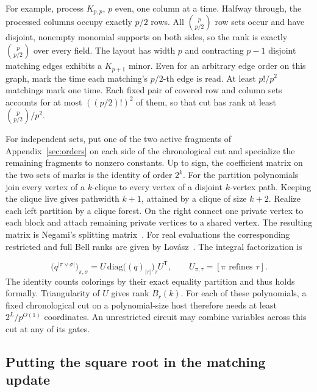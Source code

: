 \documentclass[11pt]{article}
\theoremstyle{definition}
\begin{document}
For example, process \(K_{p,p}\), \(p\) even, one column at a time. Halfway through, the processed columns occupy exactly \(p/2\) rows. All \(\binom p{p/2}\) row sets occur and have disjoint, nonempty monomial supports on both sides, so the rank is exactly \(\binom p{p/2}\) over every field. The layout has width \(p\) and contracting \(p-1\) disjoint matching edges exhibits a \(K_{p+1}\) minor. Even for an arbitrary edge order on this graph, mark the time each matching's \(p/2\)-th edge is read. At least \(p!/p^2\) matchings mark one time. Each fixed pair of covered row and column sets accounts for at most \(((p/2)!)^2\) of them, so that cut has rank at least \(\binom p{p/2}/p^2\).

For independent sets, put one of the two active fragments of Appendix~\ref{sec:orders} on each side of the chronological cut and specialize the remaining fragments to nonzero constants. Up to sign, the coefficient matrix on the two sets of marks is the identity of order \(2^k\). For the partition polynomials join every vertex of a \(k\)-clique to every vertex of a disjoint \(k\)-vertex path. Keeping the clique live gives pathwidth \(k+1\), attained by a clique of size \(k+2\). Realize each left partition by a clique forest. On the right connect one private vertex to each block and attach remaining private vertices to a shared vertex. The resulting matrix is Negami's splitting matrix~\cite{negami,burgos-negami}. For real evaluations the corresponding restricted and full Bell ranks are given by Lov\'{a}sz~\cite[Examples~4.17--4.18]{lovasz-large-networks}. The integral factorization is

\[
   \bigl(q^{|\pi\vee\sigma|}\bigr)_{\pi,\sigma}
    =U\,\mathrm{diag}\bigl((q)_{|\tau|}\bigr)_\tau U^{\mathsf T},
 \qquad U_{\pi,\tau}=[\pi\text{ refines }\tau].
\]
The identity counts colorings by their exact equality partition and thus holds formally. Triangularity of \(U\) gives rank \(B_r(k)\). For each of these polynomials, a fixed chronological cut on a polynomial-size host therefore needs at least \(2^L/p^{O(1)}\) coordinates. An unrestricted circuit may combine variables across this cut at any of its gates.

\subsection{Putting the square root in the matching update}
\end{document}
